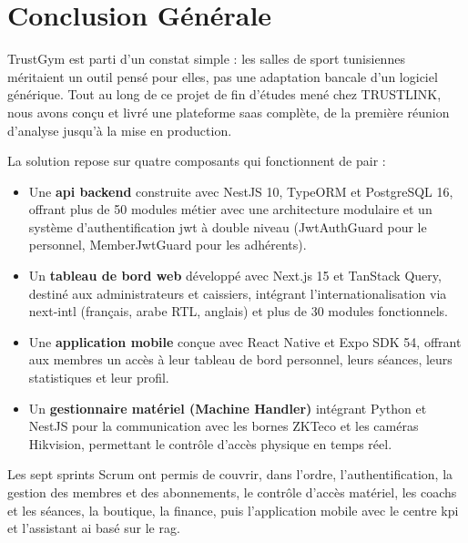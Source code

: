 \documentclass[../main.tex]{subfiles}
\begin{document}
\newpage
\section*{Conclusion G\'{e}n\'{e}rale}

TrustGym est parti d'un constat simple : les salles de sport tunisiennes m\'{e}ritaient un outil pens\'{e} pour elles, pas une adaptation bancale d'un logiciel g\'{e}n\'{e}rique. Tout au long de ce projet de fin d'\'{e}tudes men\'{e} chez TRUSTLINK, nous avons con\c{c}u et livr\'{e} une plateforme \acrshort{saas} compl\`{e}te, de la premi\`{e}re r\'{e}union d'analyse jusqu'\`{a} la mise en production.

La solution repose sur quatre composants qui fonctionnent de pair :
\begin{itemize}
    \item Une \textbf{\acrshort{api} backend} construite avec NestJS 10, TypeORM et PostgreSQL 16, offrant plus de 50 modules m\'{e}tier avec une architecture modulaire et un syst\`{e}me d'authentification \acrshort{jwt} \`{a} double niveau (JwtAuthGuard pour le personnel, MemberJwtGuard pour les adh\'{e}rents).
    \item Un \textbf{tableau de bord web} d\'{e}velopp\'{e} avec Next.js 15 et TanStack Query, destin\'{e} aux administrateurs et caissiers, int\'{e}grant l'internationalisation via next-intl (fran\c{c}ais, arabe RTL, anglais) et plus de 30 modules fonctionnels.
    \item Une \textbf{application mobile} con\c{c}ue avec React Native et Expo SDK 54, offrant aux membres un acc\`{e}s \`{a} leur tableau de bord personnel, leurs s\'{e}ances, leurs statistiques et leur profil.
    \item Un \textbf{gestionnaire mat\'{e}riel (Machine Handler)} int\'{e}grant Python et NestJS pour la communication avec les bornes ZKTeco et les cam\'{e}ras Hikvision, permettant le contr\^{o}le d'acc\`{e}s physique en temps r\'{e}el.
\end{itemize}

Les sept sprints Scrum ont permis de couvrir, dans l'ordre, l'authentification, la gestion des membres et des abonnements, le contr\^{o}le d'acc\`{e}s mat\'{e}riel, les coachs et les s\'{e}ances, la boutique, la finance, puis l'application mobile avec le centre \acrshort{kpi} et l'assistant \acrshort{ai} bas\'{e} sur le \acrshort{rag}.
\end{document}
